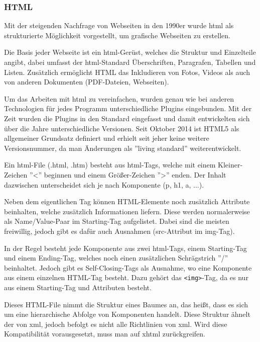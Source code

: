 \subsubsection{HTML}

Mit der steigenden Nachfrage von Webseiten in den 1990er wurde \gls{html} als strukturierte Möglichkeit vorgestellt, um grafische Webseiten zu erstellen.

Die Basis jeder Webseite ist ein \gls{html}-Gerüst, welches die Struktur und Einzelteile angibt, dabei umfasst der \gls{html}-Standard Überschriften, Paragrafen, Tabellen und Listen. Zusätzlich ermöglicht HTML das Inkludieren von Fotos, Videos als auch von anderen Dokumenten (PDF-Dateien, Webseiten). \cite{HTML-CSS}

Um das Arbeiten mit \gls{html} zu vereinfachen, wurden genau wie bei anderen Technologien für jedes Programm unterschiedliche Plugins eingebunden. Mit der Zeit wurden die Plugins in den Standard eingefasst und damit entwickelten sich über die Jahre unterschiedliche Versionen. Seit Oktober 2014 ist HTML5 als allgemeiner Grundsatz definiert und erhielt seit jeher keine weitere Versionsnummer, da man Änderungen als ''living standard'' weiterentwickelt. \cite{HTML5}

Ein \gls{html}-File (.html, .htm) besteht aus \gls{html}-Tags, welche mit einem Kleiner-Zeichen ''<'' beginnen und einem Größer-Zeichen ''>'' enden. Der Inhalt dazwischen unterscheidet sich je nach Komponente (p, h1, a, ...).

Neben dem eigentlichen Tag können HTML-Elemente noch zusätzlich Attribute beinhalten, welche zusätzlich Informationen liefern. Diese werden normalerweise als Name/Value-Paar im Starting-Tag aufgelistet. Dabei sind die meisten freiwillig, jedoch gibt es dafür auch Ausnahmen (src-Attribut im img-Tag). \cite{HTML-ATT1, HTML-ATT2}

In der Regel besteht jede Komponente aus zwei \gls{html}-Tags, einem Starting-Tag und einem Ending-Tag, welches noch einen zusätzlichen Schrägstrich ''/'' beinhaltet. Jedoch gibt es Self-Closing-Tags als Ausnahme, wo eine Komponente aus einem einzelnen HTML-Tag besteht. Dazu gehört das \lstinline{<img>}-Tag, da es nur aus einem Starting-Tag und Attributen besteht.

Dieses HTML-File nimmt die Struktur eines Baumes an, das heißt, dass es sich um eine hierarchische Abfolge von Komponenten handelt. Diese Struktur ähnelt der von \gls{xml}, jedoch befolgt es nicht alle Richtlinien von \gls{xml}. Wird diese Kompatibilität vorausgesetzt, muss man auf \gls{xhtml} zurückgreifen. \cite{HTML-CSS}

